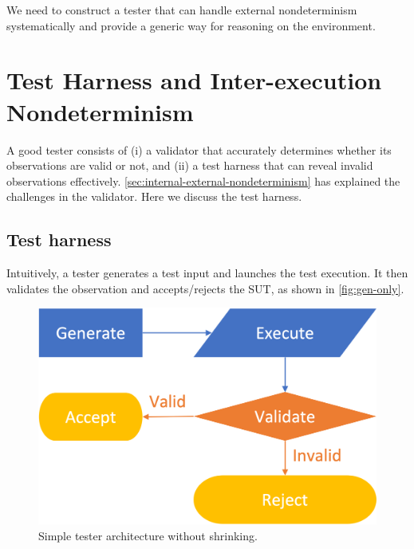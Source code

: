 We need to construct a tester that can handle external nondeterminism
systematically and provide a generic way for reasoning on the environment.

\section{Test Harness and Inter-execution Nondeterminism}
\label{sec:inter-execution-nondeterminism}
A good tester consists of (i) a validator that accurately determines whether its
observations are valid or not, and (ii) a test harness that can reveal invalid
observations effectively.  \autoref{sec:internal-external-nondeterminism} has
explained the challenges in the validator.  Here we discuss the test harness.

\subsection{Test harness}
Intuitively, a tester generates a test input and launches the test execution.
It then validates the observation and accepts/rejects the SUT, as shown in
\autoref{fig:gen-only}.
\begin{figure}
  \includegraphics[width=.5\linewidth]{figures/gen-only}
  \caption{Simple tester architecture without shrinking.}
  \label{fig:gen-only}
\end{figure}

